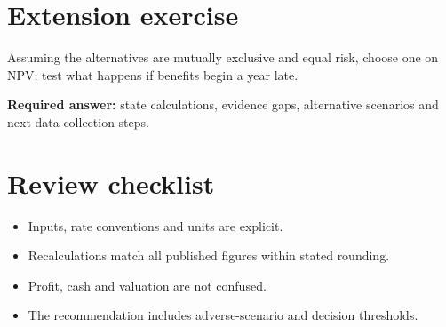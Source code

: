 \documentclass[11pt]{article}
\begin{document}
\section{Extension exercise}
Assuming the alternatives are mutually exclusive and equal risk, choose one on NPV; test what happens if benefits begin a year late.\par\textbf{Required answer:} state calculations, evidence gaps, alternative scenarios and next data-collection steps.
\section{Review checklist}
\begin{itemize}[leftmargin=*,itemsep=3pt]
\item Inputs, rate conventions and units are explicit.
\item Recalculations match all published figures within stated rounding.
\item Profit, cash and valuation are not confused.
\item The recommendation includes adverse-scenario and decision thresholds.
\end{itemize}
\end{document}

